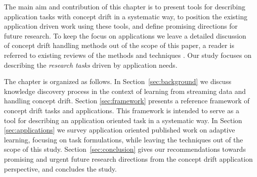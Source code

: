 \documentclass{llncs}
\begin{document}
The main aim and contribution of this chapter is to present tools for describing application tasks with concept drift in a systematic way, to position the existing application driven work using these tools, and define promising directions for future research.
To keep the focus on applications we leave a detailed discussion of concept drift handling methods out of the scope of this paper,
a reader is referred to existing reviews of the methods and techniques \cite{GamaACMCS2014,Tsymbal04,Moreno12,Kadlec11}.
Our study focuses on describing the \emph{research tasks} driven by application needs.
%
%
%

The chapter is organized as follows.
In Section~\ref{sec:background} we discuss knowledge discovery process in the context of learning from streaming data and handling concept drift.
Section \ref{sec:framework} presents a reference framework of concept drift tasks and applications.
This framework is intended to serve as a tool for describing an application oriented task in a systematic way.
In Section \ref{sec:applications} we survey application oriented published work on adaptive learning, focusing on task formulations, while leaving the techniques out of the scope of this study.
Section~\ref{sec:conclusion} gives our recommendations towards promising and urgent future research directions from the concept drift application perspective, and concludes the study.
\end{document}
